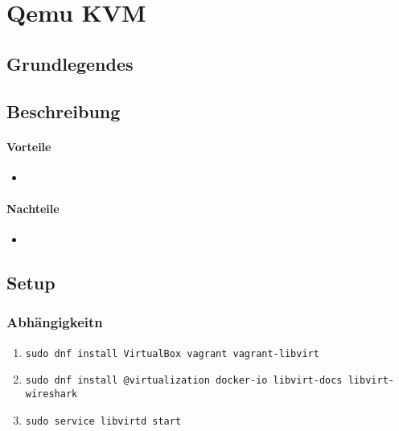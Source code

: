 

\newcommand{\SUBJECT}{Report}
\newcommand{\TITLE}{Cloud Infrastructre Lab 4}











\section{Qemu KVM}
\subsection{Grundlegendes}

\subsection{Beschreibung}
\paragraph{Vorteile}
\begin{itemize}
	\item 
\end{itemize}
\paragraph{Nachteile}
\begin{itemize}
	\item 
\end{itemize}

\subsection{Setup}
\subsubsection{Abhängigkeitn}
\begin{enumerate}
	\item \lstinline|sudo dnf install VirtualBox vagrant vagrant-libvirt|
	\item \lstinline|sudo dnf install @virtualization docker-io libvirt-docs libvirt-wireshark|
	\item \lstinline|sudo service libvirtd start|
\end{enumerate}

